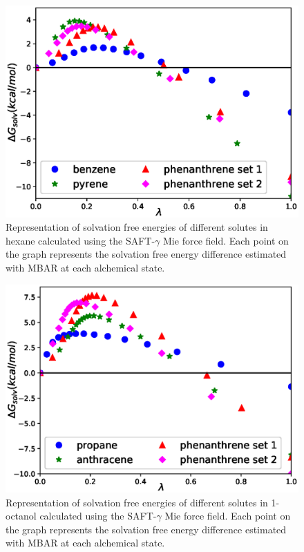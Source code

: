 \documentclass[preprint]{elsarticle}
\begin{document}
	\begin{figure}
		\centering
		\includegraphics[width=1.0\linewidth]{Figures/hexartsets.eps}
		\caption{Representation of solvation free energies of different solutes in hexane calculated using the SAFT-$\gamma$ Mie force field. Each point on the graph represents the solvation free energy difference estimated with MBAR at each alchemical state.}
		\label{fig:hex}
	\end{figure}
	\begin{figure}
		\centering
		\includegraphics[width=1.0\linewidth]{Figures/octartsets.eps}
		\caption{Representation of solvation free energies of different solutes in 1-octanol calculated using the SAFT-$\gamma$ Mie force field. Each point on the graph represents the solvation free energy difference estimated with MBAR at each alchemical state.}
		\label{fig:oct}
	\end{figure}
\end{document}
